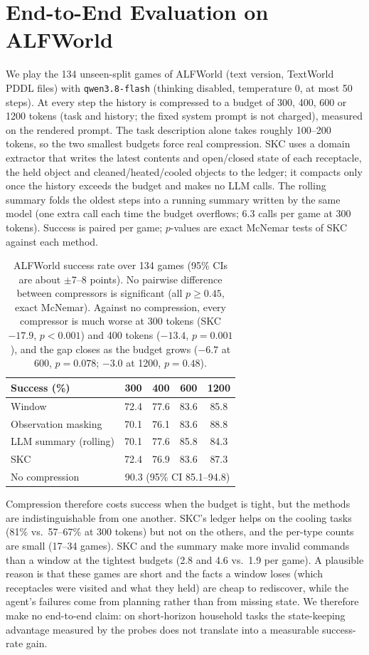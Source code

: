 \section{End-to-End Evaluation on ALFWorld}
\label{app:alfworld}
We play the 134 unseen-split games of ALFWorld (text version, TextWorld PDDL
files) with \texttt{qwen3.8-flash} (thinking disabled, temperature 0, at most 50
steps). At every step the history is compressed to a budget of 300, 400, 600 or
1200 tokens (task and history; the fixed system prompt is not charged), measured
on the rendered prompt. The task description alone takes roughly 100--200
tokens, so the two smallest budgets force real compression. SKC uses a domain
extractor that writes the latest contents and open/closed state of each
receptacle, the held object and cleaned/heated/cooled objects to the ledger; it
compacts only once the history exceeds the budget and makes no LLM calls. The
rolling summary folds the oldest steps into a running summary written by the
same model (one extra call each time the budget overflows; 6.3 calls per game
at 300 tokens). Success is paired per game; $p$-values are exact McNemar tests
of SKC against each method.

\begin{table}[h]
\centering\small
\begin{tabular}{lcccc}
\toprule
Success (\%) & 300 & 400 & 600 & 1200 \\
\midrule
Window & 72.4 & 77.6 & 83.6 & 85.8 \\
Observation masking & 70.1 & 76.1 & 83.6 & 88.8 \\
LLM summary (rolling) & 70.1 & 77.6 & 85.8 & 84.3 \\
SKC & 72.4 & 76.9 & 83.6 & 87.3 \\
\midrule
No compression & \multicolumn{4}{c}{90.3 (95\% CI 85.1--94.8)} \\
\bottomrule
\end{tabular}
\caption{ALFWorld success rate over 134 games (95\% CIs are about $\pm$7--8
points). No pairwise difference between compressors is significant (all $p\ge
0.45$, exact McNemar). Against no compression, every compressor is much worse at
300 tokens (SKC $-17.9$, $p<0.001$) and 400 tokens ($-13.4$, $p=0.001$), and
the gap closes as the budget grows ($-6.7$ at 600, $p=0.078$; $-3.0$ at 1200,
$p=0.48$).}
\label{tab:alfworld}
\end{table}
Compression therefore costs success when the budget is tight, but the methods
are indistinguishable from one another. SKC's ledger helps on the cooling tasks
(81\% vs.\ 57--67\% at 300 tokens) but not on the others, and the per-type
counts are small (17--34 games). SKC and the summary make more invalid commands
than a window at the tightest budgets (2.8 and 4.6 vs.\ 1.9 per game).
A plausible reason is that these games are short and the facts a window loses
(which receptacles were visited and what they held) are cheap to rediscover,
while the agent's failures come from planning rather than from missing state.
We therefore make no end-to-end claim: on short-horizon household tasks the
state-keeping advantage measured by the probes does not translate into a
measurable success-rate gain.

